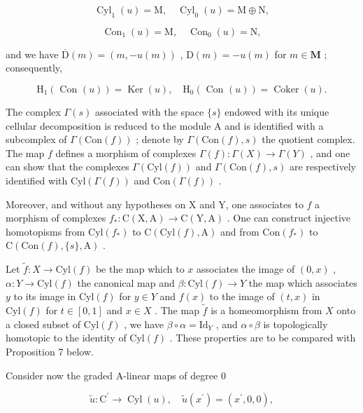 \[
\operatorname{Cyl} _ {1} (u) = \mathrm{M}, \quad \operatorname{Cyl} _ {0} (u) = \mathrm{M} \oplus \mathrm{N},
\]

\[
\operatorname{Con} _ {1} (u) = \mathrm{M}, \quad \operatorname{Con} _ {0} (u) = \mathrm{N},
\]

and we have \(\overline{\mathrm{D}}(m) = (m, -u(m))\) , \(\mathrm{D}(m) = -u(m)\) for \(m \in \mathbf{M}\) ; consequently,

\[
\mathrm{H} _ {1} (\text { Con } (u)) = \operatorname{Ker} (u), \quad \mathrm{H} _ {0} (\text { Con } (u)) = \operatorname{Coker} (u).
\]

The complex \(\Gamma(s)\) associated with the space \(\{s\}\) endowed with its unique cellular decomposition is reduced to the module A and is identified with a subcomplex of \(\Gamma(\text{Con}(f))\) ; denote by \(\Gamma(\text{Con}(f), s)\) the quotient complex. The map \(f\) defines a morphism of complexes \(\Gamma(f): \Gamma(X) \to \Gamma(Y)\) , and one can show that the complexes \(\Gamma(\text{Cyl}(f))\) and \(\Gamma(\text{Con}(f), s)\) are respectively identified with \(\text{Cyl}(\Gamma(f))\) and \(\text{Con}(\Gamma(f))\) .

Moreover, and without any hypotheses on X and Y, one associates to \(f\) a morphism of complexes \(f_{*}: \mathrm{C}(\mathrm{X}, \mathrm{A}) \to \mathrm{C}(\mathrm{Y}, \mathrm{A})\) . One can construct injective homotopisms from \(\mathrm{Cyl}(f_{*})\) to \(\mathrm{C}(\mathrm{Cyl}(f), \mathrm{A})\) and from \(\mathrm{Con}(f_{*})\) to \(\mathrm{C}(\mathrm{Con}(f), \{s\}, \mathrm{A})\) .

Let \(\tilde{f}: X \to \text{Cyl}(f)\) be the map which to \(x\) associates the image of \((0, x)\) , \(\alpha: Y \to \text{Cyl}(f)\) the canonical map and \(\beta: \text{Cyl}(f) \to Y\) the map which associates \(y\) to its image in \(\text{Cyl}(f)\) for \(y \in Y\) and \(f(x)\) to the image of \((t, x)\) in \(\text{Cyl}(f)\) for \(t \in [0, 1]\) and \(x \in X\) . The map \(\tilde{f}\) is a homeomorphism from \(X\) onto a closed subset of \(\text{Cyl}(f)\) , we have \(\beta \circ \alpha = \text{Id}_Y\) , and \(\alpha \circ \beta\) is topologically homotopic to the identity of \(\text{Cyl}(f)\) . These properties are to be compared with Proposition 7 below.

Consider now the graded A-linear maps of degree 0

\[
\tilde {u}: \mathrm{C} ^ {\prime} \rightarrow \operatorname{Cyl} (u), \quad \tilde {u} (x ^ {\prime}) = (x ^ {\prime}, 0, 0),
\]

